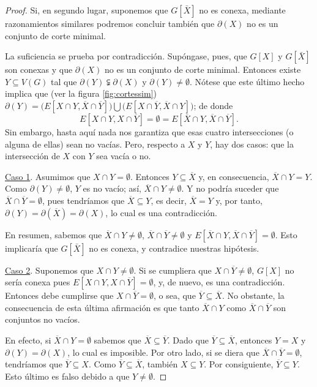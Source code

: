 \begin{proof}
Si, en segundo lugar, suponemos que $G[\bar{X}]$ no es conexa, mediante razonamientos similares podremos concluir también que $\partial(X)$ no es un conjunto de corte minimal.

La suficiencia se prueba por contradicción. Supóngase, pues, que $G[X]$ y $G[\bar{X}]$ son conexas y que $\partial(X)$ no es un conjunto de corte minimal. Entonces existe $Y \subseteq V(G)$ tal que $\partial(Y) \subsetneqq \partial(X)$ y $\partial(Y) \neq \emptyset$. Nótese que este último hecho implica que (ver la figura \ref{fig:cortessim}) $\partial(Y)= \big(E[X \cap Y, \overline{X} \cap \overline{Y}]) \bigcup (E[X \cap \overline{Y}, \overline{X} \cap Y]\big)$; de donde $$E[X \cap Y, X \cap \overline{Y}] = \emptyset = E[\overline{X} \cap Y, \overline{X} \cap \overline{Y}].$$ Sin embargo, hasta aquí nada nos garantiza que esas cuatro intersecciones (o alguna de ellas) sean no vacías. Pero, respecto a $X$ y $Y$, hay dos casos: que la intersección de $X$ con $Y$ sea vacía o no.   

\underline{Caso 1}. Asumimos que $X \cap Y = \emptyset$. Entonces $Y \subseteq \overline{X}$ y, en consecuencia, $\overline{X} \cap Y = Y$. Como $\partial(Y) \neq \emptyset$, $Y$ es no vacío; así, $\overline{X} \cap Y \neq \emptyset$. Y no podría suceder que $\overline{X} \cap \overline{Y} = \emptyset$, pues tendríamos que $\overline{X} \subseteq Y$, es decir, $\overline{X} = Y$ y, por tanto, $\partial(Y) = \partial(\overline{X})=\partial(X)$, lo cual es una contradicción.

En resumen, sabemos que $\overline{X} \cap Y \neq \emptyset$, $\overline{X} \cap \overline{Y} \neq \emptyset$ y $E[\overline{X} \cap Y, \overline{X} \cap \overline{Y}] = \emptyset$. Esto implicaría que $G[\bar{X}]$ no es conexa, y contradice nuestras hipótesis.

\underline{Caso 2}. Suponemos que $X \cap Y \neq \emptyset$. Si se cumpliera que $X \cap \overline{Y} \neq \emptyset$, $G[X]$ no sería conexa pues $E[X \cap Y, X \cap \overline{Y}] = \emptyset$, y, de nuevo, es una contradicción. Entonces debe cumplirse que $X \cap \overline{Y} = \emptyset$, o sea, que $\overline{Y} \subseteq \overline{X}$. No obstante, la consecuencia de esta última afirmación es que tanto $\overline{X} \cap Y$ como $\overline{X} \cap \overline{Y}$ son conjuntos no vacíos. 

En efecto, si $\overline{X} \cap Y = \emptyset$ sabemos que $\overline{X} \subseteq \overline{Y}$. Dado que $\overline{Y} \subseteq \overline{X}$, entonces $Y = X$ y $\partial(Y) = \partial(X)$, lo cual es imposible. Por otro lado, si se diera que $\overline{X} \cap \overline{Y} = \emptyset$, tendríamos que $\overline{Y} \subseteq X$. Como $\overline{Y} \subseteq \overline{X}$, también $X \subseteq Y$. Por consiguiente, $\overline{Y} \subseteq Y$. Esto último es falso debido a que $Y \neq \emptyset$.


\end{proof}
